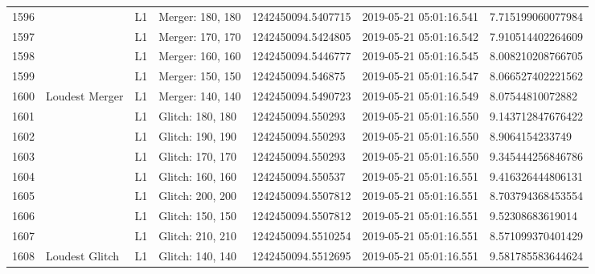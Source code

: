 \begin{longtable}{lllllll}
1596 &                                                    &       L1 &  Merger: 180, 180 &  1242450094.5407715 &  2019-05-21 05:01:16.541 &   7.715199060077984 \\
1597 &                                                    &       L1 &  Merger: 170, 170 &  1242450094.5424805 &  2019-05-21 05:01:16.542 &   7.910514402264609 \\
1598 &                                                    &       L1 &  Merger: 160, 160 &  1242450094.5446777 &  2019-05-21 05:01:16.545 &   8.008210208766705 \\
1599 &                                                    &       L1 &  Merger: 150, 150 &   1242450094.546875 &  2019-05-21 05:01:16.547 &   8.066527402221562 \\
1600 &                                     Loudest Merger &       L1 &  Merger: 140, 140 &  1242450094.5490723 &  2019-05-21 05:01:16.549 &    8.07544810072882 \\
1601 &                                                    &       L1 &  Glitch: 180, 180 &   1242450094.550293 &  2019-05-21 05:01:16.550 &   9.143712847676422 \\
1602 &                                                    &       L1 &  Glitch: 190, 190 &   1242450094.550293 &  2019-05-21 05:01:16.550 &     8.9064154233749 \\
1603 &                                                    &       L1 &  Glitch: 170, 170 &   1242450094.550293 &  2019-05-21 05:01:16.550 &   9.345444256846786 \\
1604 &                                                    &       L1 &  Glitch: 160, 160 &   1242450094.550537 &  2019-05-21 05:01:16.551 &   9.416326444806131 \\
1605 &                                                    &       L1 &  Glitch: 200, 200 &  1242450094.5507812 &  2019-05-21 05:01:16.551 &   8.703794368453554 \\
1606 &                                                    &       L1 &  Glitch: 150, 150 &  1242450094.5507812 &  2019-05-21 05:01:16.551 &    9.52308683619014 \\
1607 &                                                    &       L1 &  Glitch: 210, 210 &  1242450094.5510254 &  2019-05-21 05:01:16.551 &   8.571099370401429 \\
1608 &                                     Loudest Glitch &       L1 &  Glitch: 140, 140 &  1242450094.5512695 &  2019-05-21 05:01:16.551 &   9.581785583644624 \\

\end{longtable}
